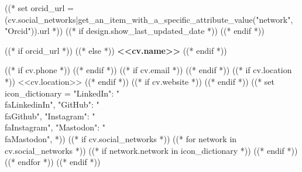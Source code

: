 ((* set orcid_url = (cv.social_networks|get_an_item_with_a_specific_attribute_value("network", "Orcid")).url *))
((* if design.show_last_updated_date *))
\placelastupdatedtext
((* endif *))

\begin{header}
    \fontsize{<<design.header_font_size>>}{<<design.header_font_size>>}
    ((* if orcid_url *))
    ((* else *))
    \textbf{<<cv.name>>}
    ((* endif *))

    \vspace{<<design.margins.header.vertical_between_name_and_connections>>}

    \normalsize
((* if cv.phone *))
    \mbox{}
    \hspace{0.5cm}
((* endif *))
((* if cv.email *))
    \mbox{}
    \hspace{0.5cm}
((* endif *))
((* if cv.location *))
    \mbox{{\small\faMapMarker*}\hspace{0.13cm}<<cv.location>>}
    \hspace{0.5cm}
((* endif *))
((* if cv.website *))
    \mbox{}
    \hspace{0.5cm}
((* endif *))
((*
    set icon_dictionary = {
        "LinkedIn": "\\faLinkedinIn",
        "GitHub": "\\faGithub",
        "Instagram": "\\faInstagram",
        "Mastodon": "\\faMastodon",
    }
*))
((* if cv.social_networks *))
    ((* for network in cv.social_networks *))
        ((* if network.network in icon_dictionary *))
    \mbox{}
    \hspace{0.5cm}
        ((* endif *))
    ((* endfor *))
((* endif *))
\end{header}

\vspace{<<design.margins.header.bottom>>}